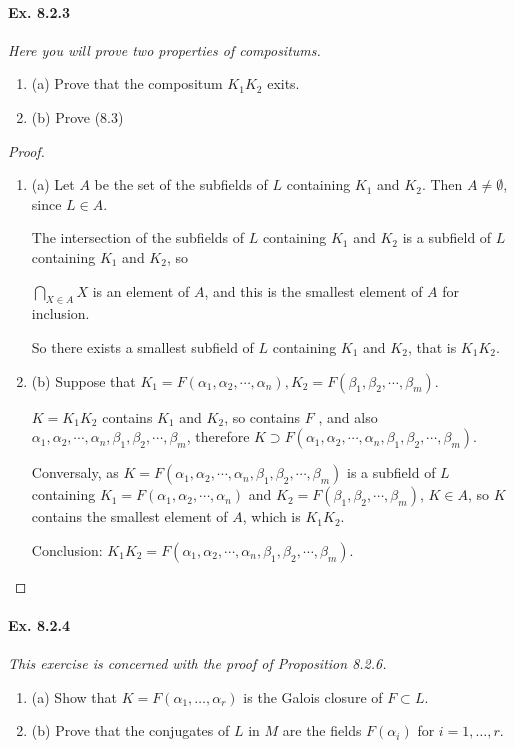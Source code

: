 \documentclass[11pt,a4paper]{article}
\newcommand{\be} {\begin{enumerate}}
\newcommand{\ee} {\end{enumerate}}
\begin{document}
\paragraph{Ex. 8.2.3}

{\it Here you will prove two properties of compositums.
\be
\item[(a)] Prove that the compositum $K_1K_2$ exits.
\item[(b)] Prove (8.3)
\ee
}

\begin{proof}
\be
\item[(a)] Let $A$ be the set of the subfields of $L$ containing $K_1$ and $K_2$. Then $A \neq \emptyset$, since $L \in A$.

The intersection of the subfields of $L$ containing $K_1$ and $K_2$ is a subfield of $L$ containing $ K_1$ and $K_2$, so 

$ \bigcap\limits_{X \in A} X$ is an element of $A$, and this is the smallest element of $A$ for inclusion.

So there exists a smallest subfield of $L$ containing $K_1$ and $K_2$, that is $K_1K_2$.

\item[(b)] Suppose that $K_1 = F(\alpha_1,\alpha_2,\cdots,\alpha_n), K_2 = F(\beta_1,\beta_2,\cdots,\beta_m)$.

$K = K_1K_2$ contains $K_1$ and $K_2$, so contains  $F$ , and also $\alpha_1,\alpha_2,\cdots,\alpha_n,\beta_1,\beta_2,\cdots,\beta_m$, therefore $K \supset F(\alpha_1,\alpha_2,\cdots,\alpha_n,\beta_1,\beta_2,\cdots,\beta_m)$.

Conversaly, as $K = F(\alpha_1,\alpha_2,\cdots,\alpha_n,\beta_1,\beta_2,\cdots,\beta_m)$ is a subfield of $L$ containing $K_1 = F(\alpha_1,\alpha_2,\cdots,\alpha_n)$ and $K_2 = F(\beta_1,\beta_2,\cdots,\beta_m)$, $K \in A$, so $K$ contains the smallest element of $A$, which is $K_1K_2$.

Conclusion: $K_1K_2 =  F(\alpha_1,\alpha_2,\cdots,\alpha_n,\beta_1,\beta_2,\cdots,\beta_m)$.
\ee
\end{proof}

\paragraph{Ex. 8.2.4}

{\it This exercise is concerned with the proof of Proposition 8.2.6.
\be
\item[(a)] Show that $K = F(\alpha_1,\ldots,\alpha_r)$ is the Galois closure of $F \subset L$.
\item[(b)] Prove that the conjugates of $L$ in $M$ are the fields $F(\alpha_i)$ for $i=1,\ldots,r$.
\ee
}
\end{document}
